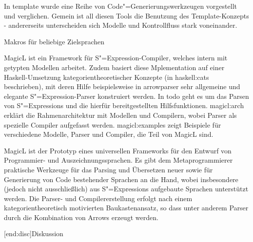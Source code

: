 \documentclass[11pt, a4paper, bibgerm]{scrbook}
\newcommand\lsection{}
\newcommand\cref{}
\newcommand\sref{}
\newcommand{\sexp}{S"=Expression}
\newcommand{\sexps}{S"=Expressions}
\newcommand{\cgen}{Code"=Generierung}
\begin{document}
In \cref{template} wurde eine Reihe von \cgen{}swerkzeugen vorgestellt
und verglichen. Gemein ist all diesen Tools die Benutzung des
Template-Konzepts - andererseits unterscheiden sich Modelle und
Kontrollfluss stark voneinander. 


Makros für beliebige Zielsprachen

MagicL ist ein Framework für \sexp-Compiler, welches
{} intern mit getypten Modellen arbeitet. Zudem basiert diese
Mplementation auf einer Haskell-Umsetzung kategorientheoretischer
Konzepte (in \sref{haskell:cats} beschrieben), mit deren Hilfe
beispielsweise in \sref{arrowparser} sehr allgemeine und elegante
\sexp{}-Parser konstruiert werden. In \sref{todo} geht es um
das Parsen von \sexps{} und die hierfür bereitgestellten
Hilfsfunktionen. \sref{magicl:arch} erklärt die Rahmenarchitektur mit
Modellen und Compilern, wobei Parser als spezielle Compiler aufgefasst
werden. \sref{magicl:examples} zeigt Beispiele für verschiedene
Modelle, Parser und Compiler, die Teil von MagicL sind.


MagicL ist der Prototyp eines
universellen Frameworks für den Entwurf von Programmier- und
Auszeichnungssprachen. Es gibt dem Metaprogrammierer praktische
Werkzeuge für das Parsing und Übersetzen neuer sowie für Generierung von
Code bestehender Sprachen an die Hand, wobei insbesondere (jedoch
nicht ausschließlich) aus \sexps{} aufgebaute Sprachen unterstützt
werden. Die Parser- und Compilererstellung erfolgt nach einem
kategorientheoretisch motivierten Baukastenansatz, so dass
unter anderem Parser durch die Kombination von Arrows erzeugt werden.

\lsection[end:disc]{Diskussion}
\end{document}
